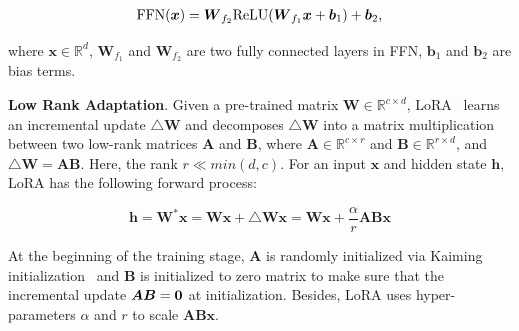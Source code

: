 {\begin{equation}
    \begin{split}
        \textup{FFN}(\boldsymbol{x}) = \boldsymbol{W}_{f_2} \textup{ReLU}(\boldsymbol{W}_{f_1} \boldsymbol{x} + \boldsymbol{b}_1) + \boldsymbol{b}_2,
    \end{split}
\end{equation}

where $\boldsymbol{x} \in \mathbb{R}^{d}$, $\boldsymbol{W}_{f_1}$ and $\boldsymbol{W}_{f_2}$ are two fully connected layers in FFN, $\boldsymbol{b}_1$ and $\boldsymbol{b}_2$ are bias terms.

\textbf{Low Rank Adaptation}. Given a pre-trained matrix $\boldsymbol{W} \in \mathbb{R}^{c \times d}$, LoRA~\citep{lora_hu2022lora} learns an incremental update $\bigtriangleup \boldsymbol{W}$ and decomposes $\bigtriangleup \boldsymbol{W}$ into  a matrix multiplication between two low-rank matrices $\boldsymbol{A}$ and $\boldsymbol{B}$, where $\boldsymbol{A}\in \mathbb{R}^{c\times r}$ and $\boldsymbol{B}\in \mathbb{R}^{r\times d}$, and $\bigtriangleup \boldsymbol{W} = \boldsymbol{A} \boldsymbol{B}$. Here, the rank $r\ll min(d,c)$. For an input $\boldsymbol{x}$ and hidden state $\boldsymbol{h}$, LoRA has the following forward process:

\begin{equation}
    \boldsymbol{h} = \boldsymbol{W}^{*} \boldsymbol{x} = \boldsymbol{W} \boldsymbol{x} + \bigtriangleup \boldsymbol{W} \boldsymbol{x} = \boldsymbol{W} \boldsymbol{x} + \frac{\alpha}{r} \boldsymbol{A} \boldsymbol{B} \boldsymbol{x}
\end{equation}

At the beginning of the training stage, $\boldsymbol{A}$ is randomly initialized via Kaiming initialization~\citep{kaimingintialization_he2015delving} and $\boldsymbol{B}$ is initialized to zero matrix to make sure that the incremental update $\boldsymbol{A}\boldsymbol{B}=\bf{0}$ at initialization. Besides, LoRA uses hyper-parameters $\alpha$ and $r$ to scale $\boldsymbol{A}\boldsymbol{B}\boldsymbol{x}$.

}
